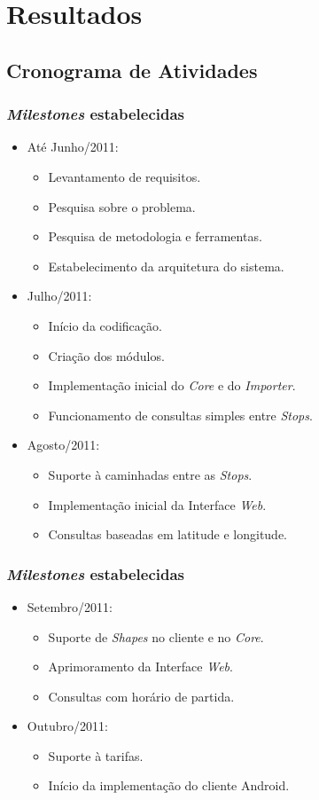 \section{Resultados}

\subsection{Cronograma de Atividades}
\frame
{
\frametitle{\emph{Milestones} estabelecidas}
\begin{itemize}
	\item Até Junho/2011:
	\begin{itemize}
		\item Levantamento de requisitos.
		\item Pesquisa sobre o problema.
		\item Pesquisa de metodologia e ferramentas.
		\item Estabelecimento da arquitetura do sistema.
	\end{itemize}
	\item Julho/2011:
	\begin{itemize}
		\item Início da codificação.
		\item Criação dos módulos.
		\item Implementação inicial do \emph{Core} e do \emph{Importer}.
		\item Funcionamento de consultas simples entre \emph{Stops}.
	\end{itemize}
	\item Agosto/2011:
	\begin{itemize}
		\item Suporte à caminhadas entre as \emph{Stops}.
		\item Implementação inicial da Interface \emph{Web}.
		\item Consultas baseadas em latitude e longitude.
	\end{itemize}
\end{itemize}
}
\frame
{
\frametitle{\emph{Milestones} estabelecidas}
\begin{itemize}
	\item Setembro/2011:
	\begin{itemize}
		\item Suporte de \emph{Shapes} no cliente e no \emph{Core}.
		\item Aprimoramento da Interface \emph{Web}.
		\item Consultas com horário de partida.
	\end{itemize}
	\item Outubro/2011:
	\begin{itemize}
		\item Suporte à tarifas.
		\item Início da implementação do cliente Android.
	\end{itemize}
\end{itemize}
}

